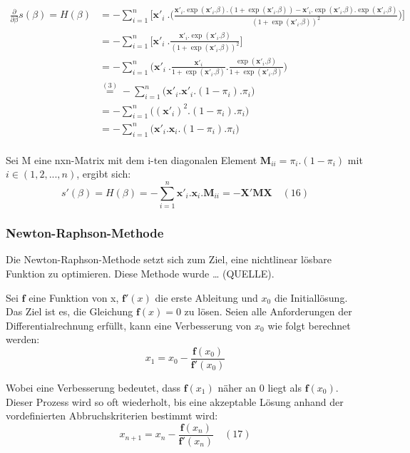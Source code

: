 \documentclass[12pt,]{article}
\begin{document}
\[
\begin{aligned}
\frac{\partial}{\partial \beta} s(\beta) = H(\beta) &= - \sum_{i = 1}^{n} \Bigg[ \mathbf{x'}_i \ . \Bigg( \frac{\mathbf{x'}_i.\exp(\mathbf{x'}_i.\beta).(1+\exp(\mathbf{x'}_i.\beta))-\mathbf{x'}_i.\exp(\mathbf{x'}_i.\beta).\exp(\mathbf{x'}_i.\beta)}{(1+\exp(\mathbf{x'}_i.\beta))^2} \Bigg) \Bigg] \\
&= - \sum_{i = 1}^{n} \Bigg[ \mathbf{x'}_i \ . \frac{\mathbf{x'}_i.\exp(\mathbf{x'}_i.\beta)}{(1+\exp(\mathbf{x'}_i.\beta))^2}  \Bigg] \\
&= - \sum_{i = 1}^{n} \Bigg( \mathbf{x'}_i \ . \frac{\mathbf{x'}_i}{1+\exp(\mathbf{x'}_i.\beta)} . \frac{\exp(\mathbf{x'}_i.\beta)}{1+\exp(\mathbf{x'}_i.\beta)} \Bigg) \\
&\mathrel{\overset{(3)}{=}} - \sum_{i = 1}^{n} \Big( \mathbf{x'}_i . \mathbf{x'}_i . (1-\pi_i) . \pi_i \Big) \\
&= - \sum_{i = 1}^{n} \Big( (\mathbf{x'}_i)^2 . (1-\pi_i) . \pi_i \Big) \\
&= - \sum_{i = 1}^{n} \Big( \mathbf{x'}_i.\mathbf{x}_i . (1-\pi_i) . \pi_i \Big) \quad \\
\end{aligned}
\]

Sei M eine nxn-Matrix mit dem i-ten diagonalen Element
\(\mathbf{M}_{ii} = \pi_i.(1-\pi_i)\) mit \(i \in (1,2,...,n)\), ergibt
sich: \[
s'(\beta) = H(\beta) = - \sum_{i = 1}^{n} \mathbf{x'}_i.\mathbf{x}_i . \mathbf{M}_{ii} = - \mathbf{X}'\mathbf{M}\mathbf{X} \quad (16)
\]

\subsubsection{Newton-Raphson-Methode}\label{newton-raphson-methode}

Die Newton-Raphson-Methode setzt sich zum Ziel, eine nichtlinear lösbare
Funktion zu optimieren. Diese Methode wurde \ldots{} (QUELLE).

Sei \(\mathbf{f}\) eine Funktion von x, \(\mathbf{f'}(x)\) die erste
Ableitung und \(x_0\) die Initiallösung. Das Ziel ist es, die Gleichung
\(\mathbf{f}(x) = 0\) zu lösen. Seien alle Anforderungen der
Differentialrechnung erfüllt, kann eine Verbesserung von \(x_0\) wie
folgt berechnet werden: \[
x_1 = x_0 - \frac{\mathbf{f}(x_0)}{\mathbf{f'}(x_0)}
\]

Wobei eine Verbesserung bedeutet, dass \(\mathbf{f}(x_1)\) näher an 0
liegt als \(\mathbf{f}(x_0)\). Dieser Prozess wird so oft wiederholt,
bis eine akzeptable Lösung anhand der vordefinierten Abbruchskriterien
bestimmt wird: \[
x_{n+1} = x_n - \frac{\mathbf{f}(x_n)}{\mathbf{f'}(x_n)} \quad (17)
\]
\end{document}
